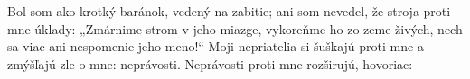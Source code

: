 Bol som ako krotký baránok,
vedený na zabitie;
ani som nevedel,
že stroja proti mne úklady:
\versseparator
„Zmárnime strom v jeho miazge,
vykoreňme ho zo zeme živých,
nech sa viac ani nespomenie jeho meno!“
\versseparator
Moji nepriatelia si šuškajú proti mne a zmýšľajú zle o mne:
neprávosti. Neprávosti proti mne rozširujú, hovoriac: